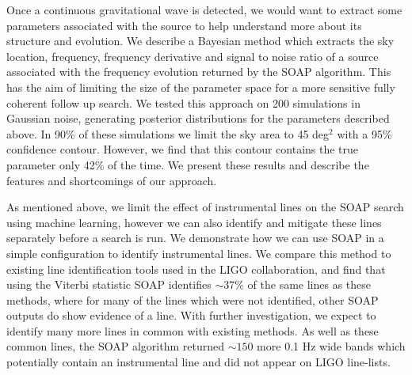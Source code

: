 Once a continuous gravitational wave is detected, we would want to extract some
parameters associated with the source to help understand more about its
structure and evolution. We describe a Bayesian method which extracts the sky
location, frequency, frequency derivative and signal to noise ratio of a source associated with the
frequency evolution returned by the SOAP algorithm.  This has the aim of
limiting the size of the parameter space for a more sensitive fully coherent
follow up search.  
We tested this approach on 200 simulations in Gaussian noise, generating posterior distributions for the parameters described above. 
In 90\% of these simulations we limit the sky area to 45 deg$^2$ with a 95\% confidence contour.
However, we find that this contour contains the true parameter only 42\% of the time.
We present these results and describe the features and shortcomings of our approach.


As mentioned above, we limit the effect of instrumental lines on the SOAP
search using machine learning, however we can also identify and mitigate these
lines separately before a search is run.  We demonstrate how we can use SOAP in
a simple configuration to identify instrumental lines.  We compare this method
to existing line identification tools used in the \gls{LIGO} collaboration, and
find that using the Viterbi statistic SOAP identifies $\sim 37$\% of the same lines as these methods, where for many of the lines which were not identified, other SOAP outputs do show evidence of a line.
With further investigation, we expect to identify many more lines in common with existing methods.
As well as these common lines, the SOAP algorithm returned $\sim 150$ more 0.1 Hz wide bands which potentially contain an instrumental line and did not appear on \gls{LIGO} line-lists.









